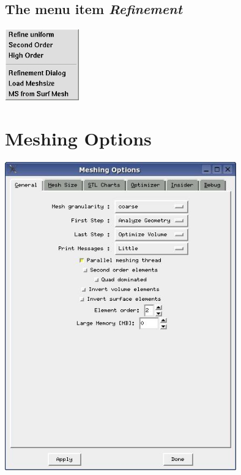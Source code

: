 \documentclass[12pt]{book}
\begin{document}
\subsection{The menu item {\em Refinement}}
\includegraphics[width=3.2cm]{pictures/menurefinement} 


\section{Meshing Options}

\includegraphics[width=10cm]{pictures/meshingoptions_1} 
\end{document}
